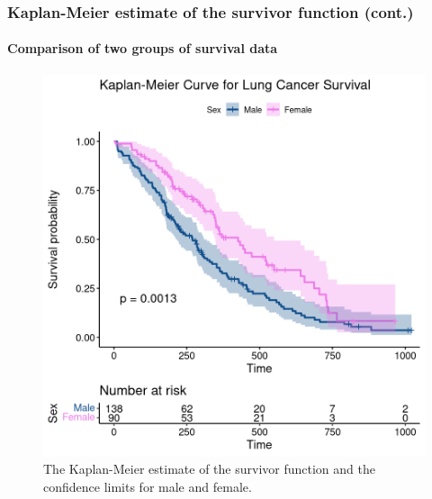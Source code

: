 \documentclass{beamer}
\begin{document}
	\begin{frame}
		\frametitle{Kaplan-Meier estimate of the survivor function (cont.)}
		\framesubtitle{Comparison of two groups of survival data}
		
		\begin{figure}[H]
			\centering
			\includegraphics[scale=.4]{sex}
			\caption{The Kaplan-Meier estimate of the survivor function and the confidence limits for male and female.}
			\label{fig:sex}
		\end{figure}
	\end{frame}
	
\end{document}
